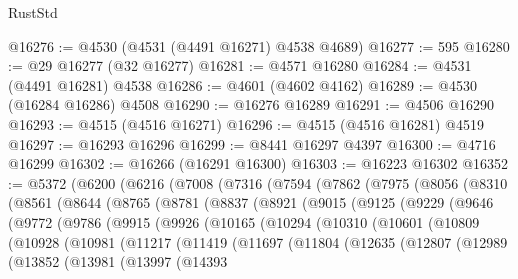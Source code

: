 \begin{lexlean}{RustStd}
\begin{coremodule}
@16276 := @4530 (@4531 (@4491 @16271) @4538 @4689)
@16277 := 595
@16280 := @29 @16277 (@32 @16277)
@16281 := @4571 @16280
@16284 := @4531 (@4491 @16281) @4538
@16286 := @4601 (@4602 @4162)
@16289 := @4530 (@16284 @16286) @4508
@16290 := @16276 @16289
@16291 := @4506 @16290
@16293 := @4515 (@4516 @16271)
@16296 := @4515 (@4516 @16281) @4519
@16297 := @16293 @16296
@16299 := @8441 @16297 @4397
@16300 := @4716 @16299
@16302 := @16266 (@16291 @16300)
@16303 := @16223 @16302
@16352 := @5372
    (@6200
      (@6216
        (@7008
          (@7316
            (@7594
              (@7862
                (@7975
                  (@8056
                    (@8310
                      (@8561
                        (@8644
                          (@8765
                            (@8781
                              (@8837
                                (@8921
                                  (@9015
                                    (@9125
                                      (@9229
                                        (@9646
                                          (@9772
                                            (@9786
                                              (@9915
                                                (@9926
                                                  (@10165
                                                    (@10294
                                                      (@10310
                                                        (@10601
                                                          (@10809
                                                            (@10928
                                                              (@10981
                                                                (@11217
                                                                  (@11419
                                                                    (@11697
                                                                      (@11804
                                                                        (@12635
                                                                          (@12807
                                                                            (@12989
                                                                              (@13852
                                                                                (@13981
                                                                                  (@13997
                                                                                    (@14393

\end{coremodule}
\end{lexlean}
